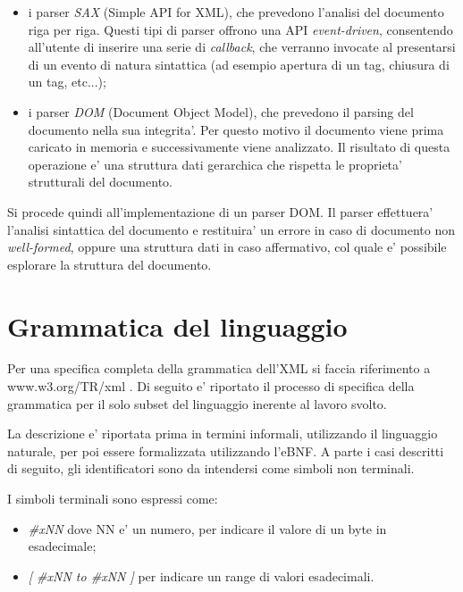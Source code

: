 \documentclass[italian,a4paper]{article}
\begin{document}
\begin{itemize}
	\item i parser \emph{SAX} (Simple API for XML), che prevedono l'analisi
		del documento riga per riga. Questi tipi di parser offrono una
		API \emph{event-driven}, consentendo all'utente di inserire una
		serie di \emph{callback}, che verranno invocate al presentarsi
		di un evento di natura sintattica (ad esempio apertura di un
		tag, chiusura di un tag, etc...);

	\item i parser \emph{DOM} (Document Object Model), che prevedono il
		parsing del documento nella sua integrita'. Per questo motivo il
		documento viene prima caricato in memoria e successivamente
		viene analizzato. Il risultato di questa operazione e' una
		struttura dati gerarchica che rispetta le proprieta' strutturali
		del documento.
\end{itemize}

Si procede quindi all'implementazione di un parser DOM. Il parser effettuera'
l'analisi sintattica del documento e restituira' un errore in caso di documento
non \emph{well-formed}, oppure una struttura dati in caso affermativo, col quale
e' possibile esplorare la struttura del documento.

\part{Grammatica del linguaggio}

Per una specifica completa della grammatica dell'XML si faccia riferimento a
www.w3.org/TR/xml .
Di seguito e' riportato il processo di specifica della grammatica per il solo
subset del linguaggio inerente al lavoro svolto.

La descrizione e' riportata prima in termini informali, utilizzando il
linguaggio naturale, per poi essere formalizzata utilizzando l'eBNF. A parte i
casi descritti di seguito, gli identificatori sono da intendersi come simboli
non terminali.

I simboli terminali sono espressi come:

\begin{itemize}
	\item \emph{\#xNN} dove NN e' un numero, per indicare il valore di un
		byte in esadecimale;

	\item \emph{[ \#xNN to \#xNN ]} per indicare un range di valori
		esadecimali.
\end{itemize}
\end{document}

